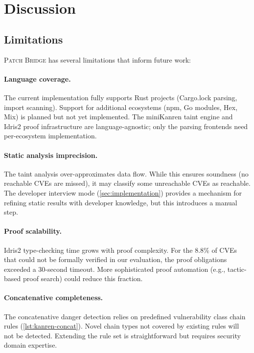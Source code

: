 \documentclass[11pt,twocolumn]{article}
\begin{document}
\section{Discussion}
\label{sec:discussion}

\subsection{Limitations}

\textsc{Patch Bridge} has several limitations that inform future work:

\paragraph{Language coverage.} The current implementation fully supports
Rust projects (Cargo.lock parsing, import scanning). Support for
additional ecosystems (npm, Go modules, Hex, Mix) is planned but not
yet implemented. The miniKanren taint engine and Idris2 proof
infrastructure are language-agnostic; only the parsing frontends need
per-ecosystem implementation.

\paragraph{Static analysis imprecision.} The taint analysis
over-approximates data flow. While this ensures soundness (no
reachable CVEs are missed), it may classify some unreachable CVEs as
reachable. The developer interview mode (\cref{sec:implementation})
provides a mechanism for refining static results with developer
knowledge, but this introduces a manual step.

\paragraph{Proof scalability.} Idris2 type-checking time grows with
proof complexity. For the 8.8\% of CVEs that could not be formally
verified in our evaluation, the proof obligations exceeded a 30-second
timeout. More sophisticated proof automation (e.g., tactic-based
proof search) could reduce this fraction.

\paragraph{Concatenative completeness.} The concatenative danger
detection relies on predefined vulnerability class chain rules
(\cref{lst:kanren-concat}). Novel chain types not covered by existing
rules will not be detected. Extending the rule set is straightforward
but requires security domain expertise.
\end{document}
